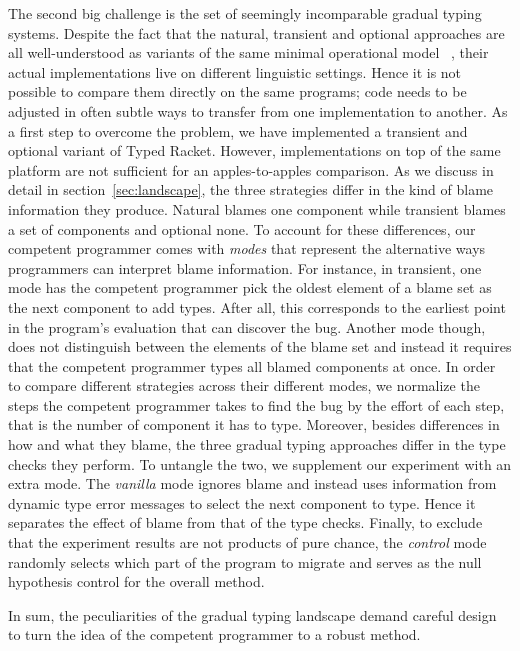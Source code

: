 The second big challenge is the set of seemingly incomparable gradual
typing systems. Despite the fact that the natural, transient and optional
approaches are all well-understood as variants of the same minimal operational model
~\cite{gf-icfp-2018, gfd-oopsla-2019}, their actual implementations live on
different linguistic settings. Hence it is not possible to compare them directly 
on the same programs; code needs to be adjusted in often subtle ways to
transfer from one implementation to another. As a first step to overcome the problem, 
we have implemented a transient and optional variant of Typed Racket.  
However,
implementations on top of the same platform are not sufficient for an
apples-to-apples comparison. As we discuss in detail in
section~\ref{sec:landscape}, the three strategies differ in the kind of
blame information they produce. Natural blames one component while
transient blames a set of components and optional none. To account for these
differences, our competent programmer comes with \emph{modes} that represent 
the alternative ways programmers can interpret blame information. For instance, in
transient, one mode  has the competent programmer pick the oldest element of a blame set 
as the next component to add types. After all, this corresponds to the
earliest point in the program's evaluation that can discover the bug. 
Another mode though, does not distinguish between the elements of the
blame set and instead it requires that the competent programmer types 
all blamed components at once. In order to compare different strategies
across their different modes, we normalize the steps the competent
programmer takes to find the bug by the effort of each step, that is the
number of component it has to type. Moreover, besides differences in how
and what they blame, the three gradual typing approaches differ in the type checks they perform. 
To untangle the two, we supplement our experiment with an extra mode. The \emph{vanilla} mode
ignores blame and instead uses information from dynamic type error messages to
select the next component to type. Hence it separates the effect of blame 
from that of the type checks. Finally, to exclude that the experiment
results are not products of pure chance, the \emph{control} mode randomly
selects which part of the program to migrate and serves as the null hypothesis
control for the overall method.

In sum, the peculiarities of the gradual typing landscape demand careful
design to turn the idea of the competent programmer to a robust method. 
